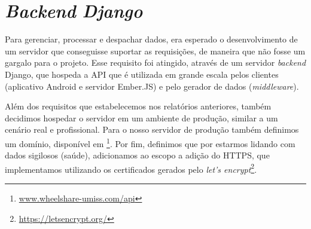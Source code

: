 \section{\textit{Backend} \textit{Django}}

Para gerenciar, processar e despachar dados, era esperado o desenvolvimento de
um servidor que conseguisse suportar as requisições,
de maneira que não fosse um gargalo para o projeto. Esse requisito foi atingido,
através de um servidor \textit{backend} Django, que hospeda a API que é
utilizada em grande escala pelos clientes (aplicativo Android e servidor
Ember.JS) e pelo gerador de dados (\textit{middleware}).

Além dos requisitos que estabelecemos nos relatórios anteriores, também
decidimos hospedar o servidor em um ambiente de produção, similar a um cenário
real e profissional. Para o nosso servidor de produção também definimos um
domínio, disponível em \footnote{\url{www.wheelshare-umiss.com/api}}. Por fim,
definimos que por estarmos lidando com dados sigilosos (saúde), adicionamos ao
escopo a adição do HTTPS, que implementamos utilizando os certificados gerados
pelo \textit{let's encrypt}\footnote{\url{https://letsencrypt.org/}}.
